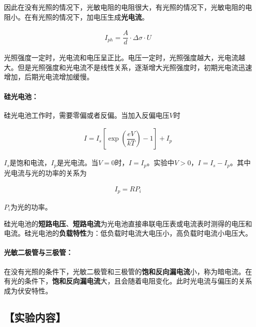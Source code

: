 \documentclass{ctexart}
\let\oldsubsection\subsection
\renewcommand{\subsection}[1]{\oldsubsection{\!\!\!\!\!\!【#1】}}
\let\oldparagraph\paragraph
\renewcommand{\paragraph}[1]{\oldparagraph{#1：\!\!\!\!\!\!}}
\begin{document}
因此在没有光照的情况下，光敏电阻的电阻很大，有光照的情况下，光敏电阻的电阻小。在有光照的情况下，加电压生成\textbf{光电流}。

\begin{equation*}
  \begin{aligned}
    I_{ph} = \dfrac{A}{d} \cdot \Delta \sigma \cdot U 
  \end{aligned}
\end{equation*}

光照强度一定时，光电流和电压呈正比。电压一定时，光照强度越大，光电流越大。但是光照强度和光电流不是线性关系，逐渐增大光照强度时，初期光电流迅速增加，后期光电流增加缓慢。

\paragraph{硅光电池}

硅光电池工作时，需要零偏或者反偏。当加入反偏电压$V$时

\begin{equation*}
  \begin{aligned}
    I = I_s \left[ \exp \left( \dfrac{eV}{kT}  \right) - 1 \right] + I_p
  \end{aligned}
\end{equation*}

$I_s$是饱和电流，$I_p$是光电流。当$V=0$时，$I=I_p$。实验中$V>0$，$I=I_s - I_p$。其中光电流与光的功率的关系为

\begin{equation*}
  \begin{aligned}
    I_p = R P_i
  \end{aligned}
\end{equation*}

$P_i$为光的功率。

硅光电池的\textbf{短路电压}、\textbf{短路电流}为光电池直接串联电压表或电流表时测得的电压和电流。硅光电池的\textbf{负载特性}为：低负载时电流大电压小，高负载时电流小电压大。

\paragraph{光敏二极管与三极管}

在没有光照的条件下，光敏二极管和三极管的\textbf{饱和反向漏电流}小，称为暗电流。在有光的条件下，\textbf{饱和反向漏电流}大，且会随着电阻变化。此时光电流与偏压的关系成为伏安特性。

\subsection{实验内容}
\end{document}
